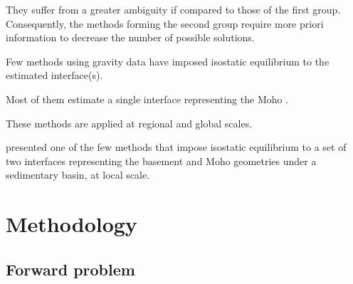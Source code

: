 \documentclass[manuscript]{geophysics}
\begin{document}
They suffer from a greater ambiguity if compared to those of the first group. 
Consequently, the methods forming the second group require more priori information to
decrease the number of possible solutions.

Few methods using gravity data have imposed isostatic equilibrium to
the estimated interface(s).

Most of them estimate a single interface representing the Moho \citep[e.g.,][]{bagherbandi-eshagh2012, sampietro2015, sjoberg2009}.

These methods are applied at regional and global scales.

\citet{salem-etal2014} presented one of the few methods that impose isostatic
equilibrium to a set of two interfaces representing the basement and Moho 
geometries under a sedimentary basin, at local scale.




\section{Methodology}


\subsection{Forward problem}
\end{document}
